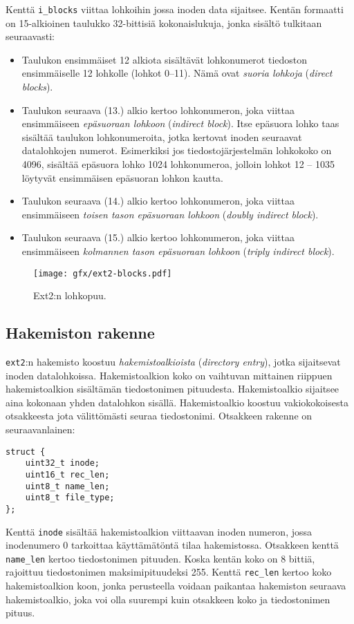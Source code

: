 Kenttä \texttt{i\_blocks} viittaa lohkoihin jossa inoden data sijaitsee.
Kentän formaatti on 15-alkioinen taulukko 32-bittisiä kokonaislukuja,
jonka sisältö tulkitaan seuraavasti:
\begin{itemize}
    \item Taulukon ensimmäiset 12 alkiota sisältävät lohkonumerot tiedoston ensimmäiselle 12 lohkolle (lohkot 0--11).
          Nämä ovat \emph{suoria lohkoja} (\emph{direct blocks}).
    \item Taulukon seuraava (13.) alkio kertoo lohkonumeron, joka viittaa ensimmäiseen \emph{epäsuoraan lohkoon} (\emph{indirect block}).
          Itse epäsuora lohko taas sisältää taulukon lohkonumeroita, jotka kertovat inoden seuraavat datalohkojen numerot.
          Esimerkiksi jos tiedostojärjestelmän lohkokoko on 4096, sisältää epäsuora lohko 1024 lohkonumeroa,
          jolloin lohkot 12 -- 1035 löytyvät ensimmäisen epäsuoran lohkon kautta.
    \item Taulukon seuraava (14.) alkio kertoo lohkonumeron, joka viittaa ensimmäiseen \emph{toisen tason epäsuoraan lohkoon} (\emph{doubly indirect block}).
    \item Taulukon seuraava (15.) alkio kertoo lohkonumeron, joka viittaa ensimmäiseen \emph{kolmannen tason epäsuoraan lohkoon} (\emph{triply indirect block}).
\end{itemize}

\begin{figure}
    \label{FigExt2BlockMap}
    \centering
    \texttt{[image: gfx/ext2-blocks.pdf]}
    \caption{Ext2:n lohkopuu.}
\end{figure}

\subsection{Hakemiston rakenne}
\texttt{ext2}:n hakemisto koostuu \emph{hakemistoalkioista} (\emph{directory entry}),
jotka sijaitsevat inoden datalohkoissa.
Hakemistoalkion koko on vaihtuvan mittainen riippuen hakemistoalkion sisältämän tiedostonimen pituudesta.
Hakemistoalkio sijaitsee aina kokonaan yhden datalohkon sisällä.
Hakemistoalkio koostuu vakiokokoisesta otsakkeesta jota välittömästi seuraa tiedostonimi.
Otsakkeen rakenne on seuraavanlainen:

\begin{samepage}
\begin{verbatim}
struct {
    uint32_t inode;
    uint16_t rec_len;
    uint8_t name_len;
    uint8_t file_type;
};
\end{verbatim}
\end{samepage}
%
Kenttä \texttt{inode} sisältää hakemistoalkion viittaavan inoden numeron,
jossa inodenumero 0 tarkoittaa käyttämätöntä tilaa hakemistossa.
Otsakkeen kenttä \texttt{name\_len} kertoo tiedostonimen pituuden.
Koska kentän koko on 8 bittiä, rajoittuu tiedostonimen maksimipituudeksi 255.
Kenttä \texttt{rec\_len} kertoo koko hakemistoalkion koon,
jonka perusteella voidaan paikantaa hakemiston seuraava hakemistoalkio,
joka voi olla suurempi kuin otsakkeen koko ja tiedostonimen pituus.

